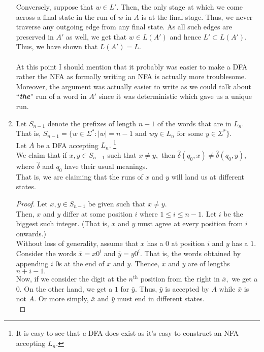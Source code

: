 \documentclass{article}
\begin{document}
\begin{enumerate}[label = \arabic*.]
	Conversely, suppose that $w \in L'.$ Then, the only stage at which we come across a final state in the run of $w$ in $A$ is at the final stage. Thus, we never traverse any outgoing edge from any final state. As all such edges are preserved in $A'$ as well, we get that $w \in L(A')$ and hence $L' \subset L(A').$\\
	Thus, we have shown that $L(A') = L.$\\~\\
	At this point I should mention that it probably was easier to make a DFA rather the NFA as formally writing an NFA is actually more troublesome. Moreover, the argument was actually easier to write as we could talk about ``\textbf{\emph{the}}'' run of a word in $A'$ since it was deterministic which gave us a unique run.
	\item Let $S_{n-1}$ denote the prefixes of length $n-1$ of the words that are in $L_n.$ That is, $S_{n-1} = \{w \in \Sigma^* : |w| = n-1 \text{ and } wy \in L_n \text{ for some } y \in \Sigma^* \}.$\\
	Let $A$ be a DFA accepting $L_n.$ \footnote{It is easy to see that \emph{a} DFA does exist as it's easy to construct an NFA accepting $L_n.$}\\
	We claim that if $x, y \in S_{n-1}$ such that $x \neq y,$ then $\hat{\delta}(q_0, x) \neq \hat{\delta}(q_0, y),$ where $\hat{\delta}$ and $q_0$ have their usual meanings.\\
	That is, we are claiming that the runs of $x$ and $y$ will land us at different states.\\
	\begin{proof}
		Let $x, y \in S_{n-1}$ be given such that $x \neq y.$\\
		Then, $x$ and $y$ differ at some position $i$ where $1 \le i \le n-1.$ Let $i$ be the biggest such integer. (That is, $x$ and $y$ must agree at every position from $i$ onwards.) \\
		Without loss of generality, assume that $x$ has a $0$ at position $i$ and $y$ has a $1.$\\
		Consider the words $\bar{x} = x0^{i}$ and $\bar{y} = y0^{i}.$ That is, the words obtained by appending $i$ $0$s at the end of $x$ and $y.$ Thence, $\bar{x}$ and $\bar{y}$ are of lengths $n + i - 1.$\\
		Now, if we consider the digit at the $n^{\text{th}}$ position from the right in $\bar{x},$ we get a $0.$ On the other hand, we get a $1$ for $\bar{y}.$ Thus, $\bar{y}$ is accepted by $A$ while $\bar{x}$ is not $A.$ Or more simply, $\bar{x}$ and $\bar{y}$ must end in different states. \\

\end{proof}
\end{enumerate}
\end{document}
